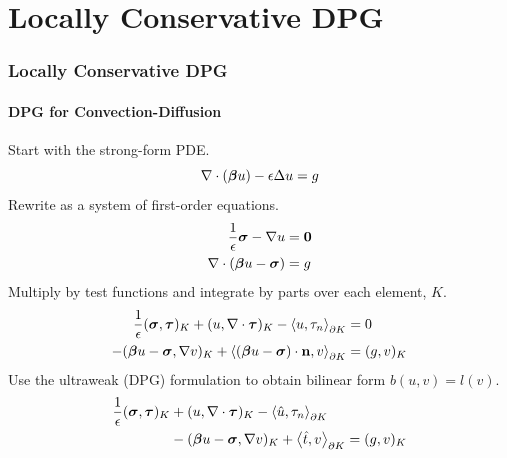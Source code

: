 \documentclass[18pt,xcolor=table]{beamer}
\begin{document}
%                      
%                      
%      
\section{Locally Conservative DPG}
\begin{frame}
\frametitle{Locally Conservative DPG}
\framesubtitle{DPG for Convection-Diffusion}
Start with the strong-form PDE.
\[
\nabla\cdot(\boldsymbol\beta u)-\epsilon\Delta u = g
\]
Rewrite as a system of first-order equations.
\begin{align*}
\frac{1}{\epsilon}\boldsymbol\sigma-\nabla u&=\boldsymbol0\\
\nabla\cdot(\boldsymbol\beta u-\boldsymbol\sigma)&=g
\end{align*}
Multiply by test functions and integrate by parts over each element, $K$.
\begin{align*}
\frac{1}{\epsilon}(\boldsymbol\sigma,\boldsymbol\tau)_K+(u,\nabla\cdot\boldsymbol\tau)_K
-\left\langle u,\tau_n \right\rangle_{\partial K}&=0\\
-(\boldsymbol\beta u-\boldsymbol\sigma,\nabla v)_K+\left\langle (\boldsymbol\beta
u-\boldsymbol\sigma)\cdot\mathbf{n},v \right\rangle_{\partial K}&=(g,v)_K
\end{align*}
Use the ultraweak (DPG) formulation to obtain bilinear form $b(u,v)=l(v)$.
\begin{align*}
\frac{1}{\epsilon}(\boldsymbol\sigma,\boldsymbol\tau)_K
&+(u,\nabla\cdot\boldsymbol\tau)_K-\left\langle \hat u,\tau_n \right\rangle_{\partial K}\\
&-(\boldsymbol\beta u-\boldsymbol\sigma,\nabla v)_K+\left\langle \hat t,v \right\rangle_{\partial K}
=(g,v)_K
\end{align*}
\end{frame}
\end{document}
